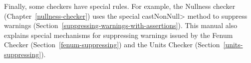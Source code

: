 Finally, some checkers have special rules.  For example, the Nullness
checker (Chapter~\ref{nullness-checker}) uses
the special \<castNonNull> method to suppress warnings
(Section~\ref{suppressing-warnings-with-assertions}).
This manual also explains special mechanisms for
suppressing warnings issued by the Fenum Checker
(Section~\ref{fenum-suppressing}) and the Units Checker
(Section~\ref{units-suppressing}).


